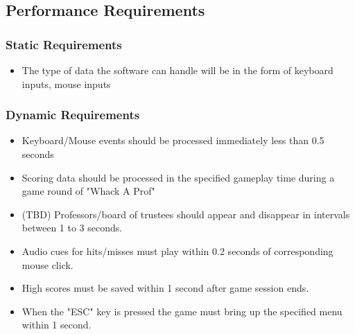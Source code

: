 \documentclass{article}
\begin{document}
\subsection{Performance Requirements}

\subsubsection{Static Requirements}
\begin{itemize}
    \item The type of data the software can handle will be in the form of keyboard inputs, mouse inputs 
\end{itemize}

\subsubsection{Dynamic Requirements}
\begin{itemize}
    \item Keyboard/Mouse events should be processed immediately less than 0.5 seconds 
    \item Scoring data should be processed in the specified gameplay time during a game round of "Whack A Prof"
    \item (TBD) Professors/board of trustees should appear and disappear in intervals between 1 to 3 seconds.
    \item Audio cues for hits/misses must play within 0.2 seconds of corresponding mouse click. 
    \item High scores must be saved within 1 second after game session ends.
    \item When the "ESC" key is pressed the game must bring up the specified menu within 1 second.

\end{itemize}
\end{document}
